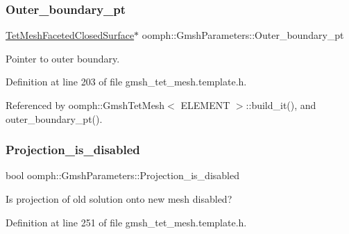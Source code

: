 \mbox{\label{classoomph_1_1GmshParameters_a310ecaffe67e67b334aafaca82c4d50a}} 
\subsubsection{\texorpdfstring{Outer\+\_\+boundary\+\_\+pt}{Outer\_boundary\_pt}}
{\footnotesize\ttfamily \hyperlink{classoomph_1_1TetMeshFacetedClosedSurface}{Tet\+Mesh\+Faceted\+Closed\+Surface}$\ast$ oomph\+::\+Gmsh\+Parameters\+::\+Outer\+\_\+boundary\+\_\+pt\hspace{0.3cm}{\ttfamily [private]}}



Pointer to outer boundary. 



Definition at line 203 of file gmsh\+\_\+tet\+\_\+mesh.\+template.\+h.



Referenced by oomph\+::\+Gmsh\+Tet\+Mesh$<$ E\+L\+E\+M\+E\+N\+T $>$\+::build\+\_\+it(), and outer\+\_\+boundary\+\_\+pt().

\mbox{\label{classoomph_1_1GmshParameters_aebabc7ca82ac23e87e164655b6dc9bb4}} 
\subsubsection{\texorpdfstring{Projection\+\_\+is\+\_\+disabled}{Projection\_is\_disabled}}
{\footnotesize\ttfamily bool oomph\+::\+Gmsh\+Parameters\+::\+Projection\+\_\+is\+\_\+disabled\hspace{0.3cm}{\ttfamily [private]}}



Is projection of old solution onto new mesh disabled? 



Definition at line 251 of file gmsh\+\_\+tet\+\_\+mesh.\+template.\+h.




